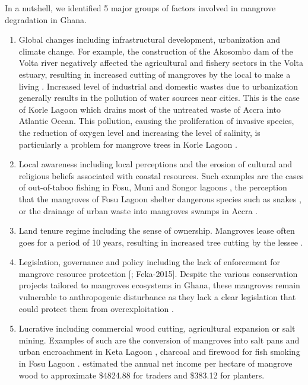 \documentclass[12pt,oneside,preprint,3p,authoryear,times]{elsarticle} %
\begin{document}
In a nutshell, we identified 5 major groups of factors involved in
mangrove degradation in Ghana.

\begin{enumerate}
\def\labelenumi{\arabic{enumi}.}
\item
  Global changes including infrastructural development, urbanization and
  climate change. For example, the construction of the Akosombo dam of
  the Volta river negatively affected the agricultural and fishery
  sectors in the Volta estuary, resulting in increased cutting of
  mangroves by the local to make a living
  \citep{Aheto-et-al-2016, Feka-and-Ajonina-2011, Rubin-et-al-1999}.
  Increased level of industrial and domestic wastes due to urbanization
  generally results in the pollution of water sources near cities. This
  is the case of Korle Lagoon which drains most of the untreated waste
  of Accra into Atlantic Ocean. This pollution, causing the
  proliferation of invasive species, the reduction of oxygen level and
  increasing the level of salinity, is particularly a problem for
  mangrove trees in Korle Lagoon \citep{Boadi-and-Kuitunen-2002}.
\item
  Local awareness including local perceptions and the erosion of
  cultural and religious beliefs associated with coastal resources. Such
  examples are the cases of out-of-taboo fishing in Fosu, Muni and
  Songor lagoons \citep{Darkwa-and-Smardon-2010, Ntiamoa-Baidu-1991},
  the perception that the mangroves of Fosu Lagoon shelter dangerous
  species such as snakes \citep{Darkwa-and-Smardon-2010}, or the
  drainage of urban waste into mangroves swamps in Accra
  \citep{Essumang-et-al-2012}.
\item
  Land tenure regime including the sense of ownership. Mangroves lease
  often goes for a period of 10 years, resulting in increased tree
  cutting by the lessee \citep{Armah-et-al-2009}.
\item
  Legislation, governance and policy including the lack of enforcement
  for mangrove resource protection {[}\citet{Armah-et-al-2009};
  Feka-2015{]}. Despite the various conservation projects tailored to
  mangroves ecosystems in Ghana, these mangroves remain vulnerable to
  anthropogenic disturbance as they lack a clear legislation that could
  protect them from overexploitation \citep{Asante-et-al-2017}.
\item
  Lucrative including commercial wood cutting, agricultural expansion or
  salt mining. Examples of such are the conversion of mangroves into
  salt pans and urban encroachment in Keta Lagoon
  \citep{Asante-et-al-2017}, charcoal and firewood for fish smoking in
  Fosu Lagoon \citep{Darkwa-and-Smardon-2010}. \citet{Aheto-et-al-2016}
  estimated the annual net income per hectare of mangrove wood to
  approximate \$4824.88 for traders and \$383.12 for planters.
\end{enumerate}
\end{document}
